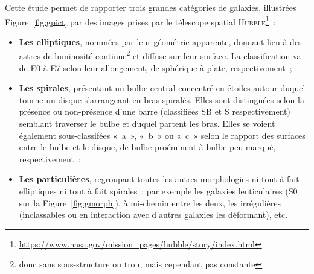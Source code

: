 \documentclass[../main/main.tex]{subfiles}
\begin{document}
Cette étude permet de rapporter trois grandes catégories de galaxies, illustrées
Figure~\ref{fig:gpict} par des images prises par le télescope spatial
\textsc{Hubble}\footnote{\label{fn:hst1}\href{
    https://www.nasa.gov/mission_pages/hubble/story/index.html}
{https://www.nasa.gov/mission\_pages/hubble/story/index.html}}~:

\begin{itemize}
    \item \textbf{Les elliptiques}, nommées par leur géométrie apparente,
        donnant lieu à des astres de luminosité continue\footnote{donc sans
        sous-structure ou trou, mais cependant pas constante} et diffuse sur
        leur surface. La classification va de E0 à E7 selon leur allongement, de
        sphérique à plate, respectivement~;
    \item \textbf{Les spirales}, présentant un bulbe central concentré en
        étoiles autour duquel tourne un disque s'arrangeant en bras spiralés.
        Elles sont distinguées selon la présence ou non-présence d'une barre
        (classifiées SB et S respectivement) semblant traverser le bulbe et
        duquel partent les bras. Elles se voient également sous-classifées
        «~a~», «~b~» ou «~c~» selon le rapport des surfaces entre le bulbe et le
        disque, de bulbe proéminent à bulbe peu marqué, respectivement~;
    \item \textbf{Les particulières}, regroupant toutes les autres morphologies
        ni tout à fait elliptiques ni tout à fait spirales~; par exemple les
        galaxies lenticulaires (S0 sur la Figure~\ref{fig:gmorph}), à mi-chemin
        entre les deux, les irrégulières (inclassables ou en interaction avec
        d'autres galaxies les déformant), etc.
\end{itemize}
\end{document}

